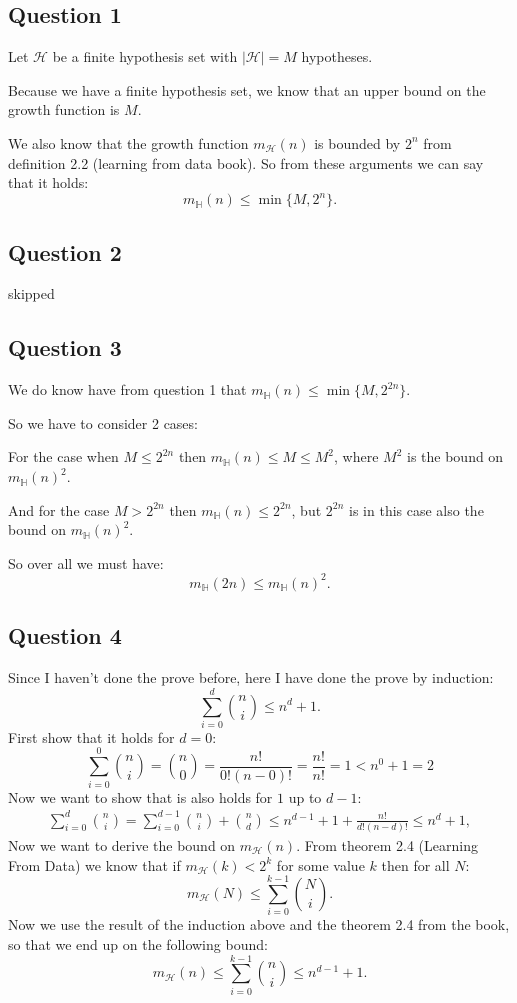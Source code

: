 \subsection{Question 1}
Let $\mathcal{H}$ be a finite hypothesis set with $|\mathcal{H}|=M$ hypotheses. 

Because we have a finite hypothesis set, we know that an upper bound on the growth function is $M$.

We also know that the growth function $m_{\mathcal{H}}(n)$ is bounded by $2^n$ from definition 2.2 (learning from data book).
So from these arguments we can say that it holds:
\[ m_{\mathbb{H}}(n) \leq \min \lbrace M, 2^n \rbrace. \]   

\subsection{Question 2}
skipped
\subsection{Question 3}
We do know have from question 1 that $m_{\mathbb{H}}(n) \leq \min \lbrace M, 2^{2n} \rbrace$. 

So we have to consider 2 cases:

For the case when $M \leq 2^{2n}$ then $m_{\mathbb{H}}(n) \leq M \leq M^2$, where $M^2$ is the bound on $m_{\mathbb{H}}(n)^2$. 

And for the case $M > 2^{2n}$ then $m_{\mathbb{H}}(n) \leq 2^{2n}$, but $2^{2n}$ is in this case also the bound on $m_{\mathbb{H}}(n)^2$. 

So over all we must have:
\[m_{\mathbb{H}}(2n)\leq m_{\mathbb{H}}(n)^2 .\] 


\subsection{Question 4}
Since I haven't done the prove before, here I have done the prove by induction:
\[ \sum_{i=0}^d \binom{n}{i} \leq n^d+1. \] 
First show that it holds for $d=0$: 
\[ \sum_{i=0}^0 \binom{n}{i}=\binom{n}{0}=\frac{n!}{0!(n-0)!}=\frac{n!}{n!}=1 < n^0+1=2 \]
Now we want to show that is also holds for $1$ up to $d-1$:
\begin{align*}
\sum_{i=0}^d \binom{n}{i} = \sum_{i=0}^{d-1} \binom{n}{i} + \binom{n}{d} {\leq} n^{d-1}+1+\frac{n!}{d!(n-d)!} \leq n^d+1,
\end{align*}
Now we want to derive the bound on $m_{\mathcal{H}}(n)$.
From theorem 2.4 (Learning From Data) we know that if $m_{\mathcal{H}}(k) < 2^k$ for some  value $k$ then for all $N$:
\[m_{\mathcal{H}}(N) \leq \sum_{i=0}^{k-1} \binom{N}{i}. \]
Now we use the result of the induction above and the theorem 2.4 from the book, so that we end up on the following bound:
\[m_{\mathcal{H}}(n) \leq \sum_{i=0}^{k-1} \binom{n}{i} \leq n^{d-1}+1. \] 
